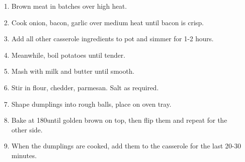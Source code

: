 \begin{enumerate}
    \item Brown meat in batches over high heat.
    \item Cook onion, bacon, garlic over medium heat until bacon is crisp.
    \item Add all other casserole ingredients to pot and simmer for 1-2 hours.
    \item Meanwhile, boil potatoes until tender.
    \item Mash with milk and butter until smooth.
    \item Stir in flour, chedder, parmesan. Salt as required.
    \item Shape dumplings into rough balls, place on oven tray.
    \item Bake at 180\celsius until golden brown on top, then flip them and repeat for the other side.
    \item When the dumplings are cooked, add them to the casserole for the last 20-30 minutes.
\end{enumerate}
